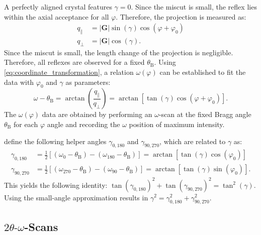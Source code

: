 A perfectly aligned crystal features $\gamma = 0$. Since the miscut is small, the
reflex lies within the axial acceptance for all $\varphi$. Therefore, the projection
is measured as:
\begin{equation}
	\begin{aligned}
		q_{\parallel} & =\lvert \mathbf{G}\rvert \sin(\gamma) \cos(\varphi+\varphi_{0}) \\
		q_{\perp}     & =\lvert \mathbf{G}\rvert \cos(\gamma).
	\end{aligned}
\end{equation}
Since the miscut is small, the length change of the projection is negligible.
Therefore, all reflexes are observed for a fixed $\theta_{\mathrm{B}}$. Using
\cref{eq:coordinate_transformation}, a relation $\omega(\varphi)$ can be established
to fit the data with $\varphi_{0}$ and $\gamma$ as parameters:
\begin{equation}
	\omega-\theta_{\mathrm{B}}=\arctan\left( \frac{q_{\parallel}}{q_{\perp}}\right)
	=\arctan[\tan(\gamma)\cos(\varphi+\varphi_{0})].
\end{equation}
The $\omega(\varphi)$ data are obtained by performing an $\omega$-scan at the
fixed Bragg angle $\theta_{\mathrm{B}}$ for each $\varphi$ angle and recording
the $\omega$ position of maximum intensity.

 define the following helper angles $\gamma_{0,180}$
and $\gamma_{90,270}$, which are related to $\gamma$ as:
\begin{align}
	\gamma_{0, 180}  & =\frac{1}{2}[(\omega_{0}-\theta_{\mathrm{B}})-(\omega_{180}-\theta_{\mathrm{B}})]=\arctan[\tan(\gamma) \cos(\varphi_{0})]    \\
	\gamma_{90, 270} & = \frac{1}{2}[(\omega_{270}-\theta_{\mathrm{B}})-(\omega_{90}-\theta_{\mathrm{B}})]=\arctan[\tan(\gamma) \sin(\varphi_{0})].
\end{align}
This yields the following identity:
$\tan(\gamma_{0, 180})^{2}+\tan(\gamma_{90, 270})^{2}=\tan^{2}(\gamma)$. Using the
small-angle approximation results in $\gamma^{2}=\gamma_{0, 180}^{2}+\gamma_{90, 270}
^{2}$.

\subsection{$2\theta\text{-}\omega$-Scans}
\label{sec:2to}

